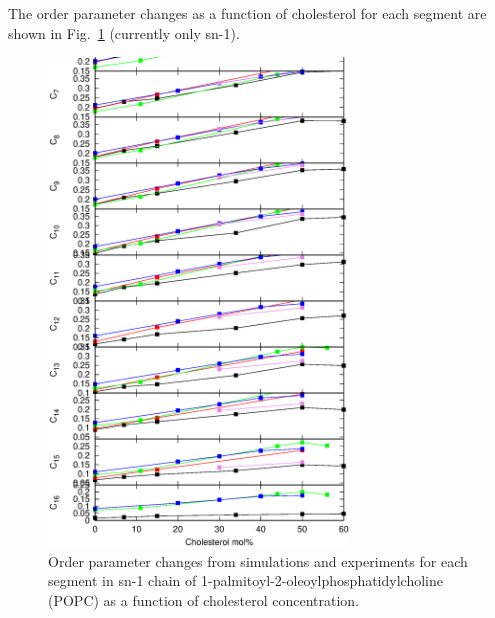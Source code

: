 \documentclass[aps,prl,superscriptaddress,twocolumn]{revtex4}
\begin{document}
The order parameter changes as a function of cholesterol for each segment are shown in Fig.~\ref{OrderParametersCHOLchanges}
(currently only sn-1). \\
\begin{figure}[]
  \centering
  \includegraphics[width=8cm]{../FIGS/OrderParametersCHANGEScholSN1.eps}
  \caption{\label{OrderParametersCHOLchanges}
    Order parameter changes from simulations and experiments for each segment in sn-1 chain of  1-palmitoyl-2-oleoylphosphatidylcholine (POPC) as a function of cholesterol concentration.}
  
\end{figure}

\end{document}
